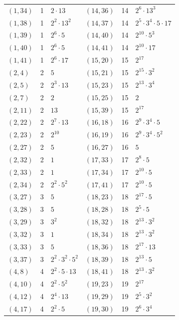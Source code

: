 \documentclass[11pt]{article}
\begin{document}
\begin{longtable}{@{}lrl@{\qquad}lrl@{}}
$(1,34)$ & 1 & $2\cdot 13$ & $(14,36)$ & 14 & $2^{6}\cdot 13^{3}$\\
$(1,38)$ & 1 & $2^{2}\cdot 13^{2}$ & $(14,37)$ & 14 & $2^{5}\cdot 3^{4}\cdot 5\cdot 17$\\
$(1,39)$ & 1 & $2^{6}\cdot 5$ & $(14,40)$ & 14 & $2^{10}\cdot 5^{3}$\\
$(1,40)$ & 1 & $2^{6}\cdot 5$ & $(14,41)$ & 14 & $2^{10}\cdot 17$\\
$(1,41)$ & 1 & $2^{6}\cdot 17$ & $(15,20)$ & 15 & $2^{17}$\\
$(2,4)$ & 2 & $5$ & $(15,21)$ & 15 & $2^{15}\cdot 3^{2}$\\
$(2,5)$ & 2 & $2^{3}\cdot 13$ & $(15,23)$ & 15 & $2^{13}\cdot 3^{4}$\\
$(2,7)$ & 2 & $2$ & $(15,25)$ & 15 & $2$\\
$(2,11)$ & 2 & $13$ & $(15,39)$ & 15 & $2^{17}$\\
$(2,22)$ & 2 & $2^{7}\cdot 13$ & $(16,18)$ & 16 & $2^{9}\cdot 3^{4}\cdot 5$\\
$(2,23)$ & 2 & $2^{10}$ & $(16,19)$ & 16 & $2^{9}\cdot 3^{4}\cdot 5^{2}$\\
$(2,27)$ & 2 & $5$ & $(16,27)$ & 16 & $5$\\
$(2,32)$ & 2 & $1$ & $(17,33)$ & 17 & $2^{8}\cdot 5$\\
$(2,33)$ & 2 & $1$ & $(17,34)$ & 17 & $2^{10}\cdot 5$\\
$(2,34)$ & 2 & $2^{2}\cdot 5^{2}$ & $(17,41)$ & 17 & $2^{10}\cdot 5$\\
$(3,27)$ & 3 & $5$ & $(18,23)$ & 18 & $2^{17}\cdot 5$\\
$(3,28)$ & 3 & $5$ & $(18,28)$ & 18 & $2^{5}\cdot 5$\\
$(3,29)$ & 3 & $3^{2}$ & $(18,32)$ & 18 & $2^{13}\cdot 3^{2}$\\
$(3,32)$ & 3 & $1$ & $(18,34)$ & 18 & $2^{13}\cdot 3^{2}$\\
$(3,33)$ & 3 & $5$ & $(18,36)$ & 18 & $2^{17}\cdot 13$\\
$(3,37)$ & 3 & $2^{2}\cdot 3^{2}\cdot 5^{2}$ & $(18,39)$ & 18 & $2^{13}\cdot 5$\\
$(4,8)$ & 4 & $2^{2}\cdot 5\cdot 13$ & $(18,41)$ & 18 & $2^{13}\cdot 3^{2}$\\
$(4,10)$ & 4 & $2^{2}\cdot 5^{2}$ & $(19,23)$ & 19 & $2^{17}$\\
$(4,12)$ & 4 & $2^{4}\cdot 13$ & $(19,29)$ & 19 & $2^{5}\cdot 3^{2}$\\
$(4,17)$ & 4 & $2^{2}\cdot 5$ & $(19,30)$ & 19 & $2^{6}\cdot 3^{4}$\\

\end{longtable}
\end{document}
